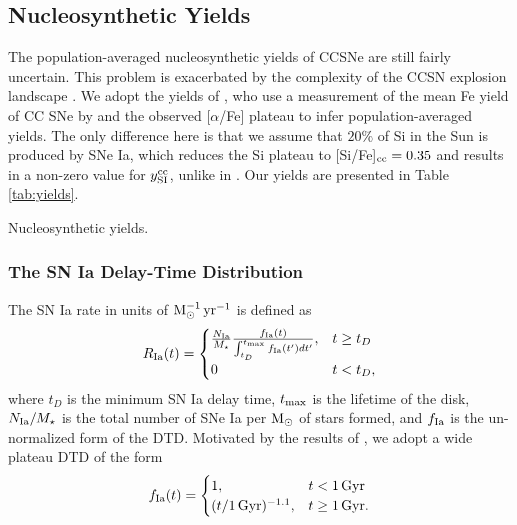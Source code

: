 \documentclass[twocolumn,twocolappendix,linenumbers]{aastex631}
\newcommand{\aFe}{[$\alpha$/Fe]\xspace}
\begin{document}
\subsection{Nucleosynthetic Yields}
\label{sec:yields}

The population-averaged nucleosynthetic yields of CCSNe are still fairly uncertain. This problem is exacerbated by the complexity of the CCSN explosion landscape \citep{sukhbold_core-collapse_2016}. We adopt the yields of \citet{weinberg_scale_2023}, who use a measurement of the mean Fe yield of CC SNe by \citet{rodriguez_iron_2023} and the observed \aFe plateau to infer population-averaged yields. The only difference here is that we assume that $20\%$ of Si in the Sun is produced by SNe Ia, which reduces the Si plateau to [Si/Fe]$_{\rm cc}=0.35$ and results in a non-zero value for $y_{\rm SI}^{\rm cc}$, unlike in \citet{weinberg_scale_2023}. Our yields are presented in Table \ref{tab:yields}.

\begin{table}
    \centering
    \caption{Nucleosynthetic yields.}
    \label{tab:yields}
    
\end{table}

\subsubsection{The SN Ia Delay-Time Distribution}
\label{sec:dtd}

The SN Ia rate in units of ${\rm M}_\odot^{-1}\,{\rm yr}^{-1}$ is defined as
\begin{equation}
    R_{\rm Ia}(t) = 
    \begin{cases}
        \frac{N_{\rm Ia}}{M_\star}
        \frac{f_{\rm Ia}(t)}{\int_{t_D}^{t_{\rm max}} f_{\rm Ia}(t') dt'}, & t \ge t_D \\
        0 & t < t_D,
    \end{cases}
    \label{eq:dtd-function}
\end{equation}
where $t_D$ is the minimum SN Ia delay time, $t_{\rm max}$ is the lifetime of the disk, $N_{\rm Ia}/M_\star$ is the total number of SNe Ia per ${\rm M}_\odot$ of stars formed, and $f_{\rm Ia}$ is the un-normalized form of the DTD. Motivated by the results of \citet{dubay_galactic_2024}, we adopt a wide plateau DTD of the form
\begin{equation}
    \label{eq:plateau-dtd}
    f_{\rm Ia}(t) =
    \begin{cases}
        1, & t < 1\,{\rm Gyr} \\
        (t/1\,{\rm Gyr})^{-1.1}, & t \ge 1\,{\rm Gyr}.
    \end{cases}
\end{equation}
\end{document}
